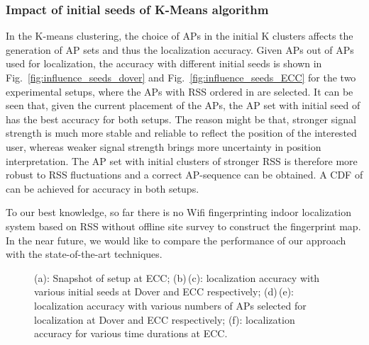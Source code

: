 \documentclass[10pt, conference, letterpaper]{IEEEtran}
\begin{document}
\subsubsection{Impact of initial seeds of K-Means algorithm}
In the K-means clustering, the choice of APs in the initial K clusters affects the generation of AP sets and thus the localization accuracy. 
Given  APs out of  APs used for localization, the accuracy with different initial seeds is shown in Fig.~\ref{fig:influence_seeds_dover} and Fig.~\ref{fig:influence_seeds_ECC} for the two experimental setups, 
where the APs with RSS ordered in  are selected. 
It can be seen that, given the current placement of the  APs, the AP set with initial seed of  has the best accuracy for both setups.
The reason might be that, stronger signal strength is much more stable and reliable to reflect the position of the interested user, 
whereas weaker signal strength brings more uncertainty in position interpretation. 
The AP set with initial clusters of stronger RSS is therefore more robust to RSS fluctuations and a correct AP-sequence can be obtained. 
A CDF of  can be achieved for accuracy  in both setups.

To our best knowledge, so far there is no Wifi fingerprinting indoor localization system based on RSS without offline site survey to construct the fingerprint map. 
In the near future, we would like to compare the performance of our approach with the state-of-the-art techniques.

\begin{figure*}
  \centering
   \caption[Mean Localization Accuracy under the Impact of the numbers of the slected APs.]
{(a): Snapshot of setup at ECC;
(b)\,(c): localization accuracy with various initial seeds at Dover and ECC respectively;
(d)\,(e): localization accuracy with various numbers of APs selected for localization at Dover and ECC respectively; 
(f): localization accuracy for various time durations at ECC.
}
\label{fig:experimental_results}
\vspace{-0.15in}
\end{figure*}
\end{document}
